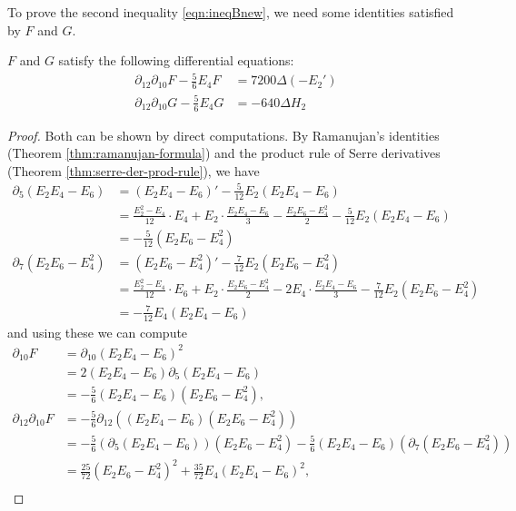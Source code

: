 To prove the second inequality \eqref{eqn:ineqBnew}, we need some identities satisfied by $F$ and $G$.
\begin{lemma}\label{lemma:FG-de}\leanok
$F$ and $G$ satisfy the following differential equations:
\begin{align}
    \partial_{12}\partial_{10} F - \frac{5}{6} E_{4} F &= 7200 \Delta (-E_{2}') \label{eqn:ddf} \\
    \partial_{12}\partial_{10} G - \frac{5}{6} E_{4} G &= -640 \Delta H_{2} \label{eqn:ddg}
\end{align}
\end{lemma}
\begin{proof}
Both can be shown by direct computations.
By Ramanujan's identities (Theorem \ref{thm:ramanujan-formula}) and the product rule of Serre derivatives (Theorem \ref{thm:serre-der-prod-rule}), we have
\begin{align}
    \partial_{5} (E_2 E_4 - E_6) &= (E_2 E_4 - E_6)' - \frac{5}{12} E_2 (E_2 E_4 - E_6) \\
    &= \frac{E_2^2 - E_4}{12} \cdot E_4 + E_2 \cdot \frac{E_2 E_4 - E_6}{3} - \frac{E_2 E_6 - E_4^2}{2} - \frac{5}{12}E_2 (E_2 E_4 - E_6) \\
    &= -\frac{5}{12} (E_2 E_6 - E_4^2) \label{eqn:S5} \\
    \partial_{7} (E_2 E_6 - E_4^2) &= (E_2 E_6 - E_4^2)' - \frac{7}{12} E_2 (E_2 E_6 - E_4^2) \\
    &= \frac{E_2^2 - E_4}{12} \cdot E_6 + E_2 \cdot \frac{E_2 E_6 - E_4^2}{2} - 2 E_4 \cdot \frac{E_2 E_4 - E_6}{3} - \frac{7}{12} E_2 (E_2 E_6 - E_4^2) \\
    &= -\frac{7}{12} E_4 (E_2 E_4 - E_6) \label{eqn:S7}
\end{align}
and using these we can compute
\begin{align}
    \partial_{10} F &= \partial_{10} (E_2 E_4 - E_6)^2 \\
    &= 2 (E_2 E_4 - E_6) \partial_{5} (E_2 E_4 - E_6) \\
    &= -\frac{5}{6} (E_2 E_4 - E_6) (E_2 E_6 - E_4^2), \\
    \partial_{12}\partial_{10} F &= -\frac{5}{6} \partial_{12} ((E_2 E_4 - E_6) (E_2 E_6 - E_4^2)) \\
    &= -\frac{5}{6} (\partial_{5}(E_2 E_4 - E_6)) (E_2 E_6 - E_4^2) - \frac{5}{6} (E_2 E_4 - E_6) (\partial_{7} (E_2 E_6 - E_4^2)) \\
    &= \frac{25}{72} (E_2 E_6 - E_4^2)^2 + \frac{35}{72} E_4 (E_2 E_4 - E_6)^2, \\

\end{align}
\end{proof}

